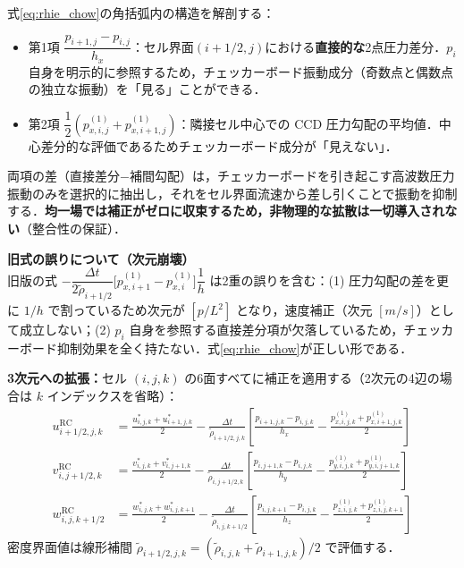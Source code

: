 \documentclass[12pt, a4paper, titlepage]{article}
\newcommand{\jp}[1]{{\normalfont\jpfont #1}}
\begin{document}
\jp{式\eqref{eq:rhie_chow}の角括弧内の構造を解剖する：}
\begin{itemize}
  \item \jp{第1項 $\dfrac{p_{i+1,j}-p_{i,j}}{h_x}$：セル界面$(i+1/2,j)$における\textbf{直接的な}2点圧力差分．$p_i$ 自身を明示的に参照するため，チェッカーボード振動成分（奇数点と偶数点の独立な振動）を「見る」ことができる．}
  \item \jp{第2項 $\dfrac{1}{2}\!\left(p^{(1)}_{x,i,j}+p^{(1)}_{x,i+1,j}\right)$：隣接セル中心での CCD 圧力勾配の平均値．中心差分的な評価であるためチェッカーボード成分が「見えない」．}
\end{itemize}
\jp{両項の差（直接差分$-$補間勾配）は，チェッカーボードを引き起こす高波数圧力振動のみを選択的に抽出し，それをセル界面流速から差し引くことで振動を抑制する．\textbf{均一場では補正がゼロに収束するため，非物理的な拡散は一切導入されない}（整合性の保証）．}

\begin{tcolorbox}[warnbox]
\textbf{\jp{旧式の誤りについて（次元崩壊）}}\\
\jp{旧版の式 $-\dfrac{\Delta t}{2\tilde\rho_{i+1/2}}\bigl[p^{(1)}_{x,i+1}-p^{(1)}_{x,i}\bigr]\dfrac{1}{h}$ は2重の誤りを含む：(1) 圧力勾配の差を更に $1/h$ で割っているため次元が $[p/L^2]$ となり，速度補正（次元 $[m/s]$）として成立しない；(2) $p_i$ 自身を参照する直接差分項が欠落しているため，チェッカーボード抑制効果を全く持たない．式\eqref{eq:rhie_chow}が正しい形である．}
\end{tcolorbox}

\jp{\textbf{3次元への拡張：}セル $(i,j,k)$ の6面すべてに補正を適用する（2次元の4辺の場合は $k$ インデックスを省略）：}
\begin{align}
  u_{i+1/2,j,k}^{\mathrm{RC}} &= \frac{u^*_{i,j,k}+u^*_{i+1,j,k}}{2}
    - \frac{\Delta t}{\tilde\rho_{i+1/2,j,k}}\!\left[\frac{p_{i+1,j,k}-p_{i,j,k}}{h_x}
      -\frac{p^{(1)}_{x,i,j,k}+p^{(1)}_{x,i+1,j,k}}{2}\right]\label{eq:rhie_chow_u}\\[3pt]
  v_{i,j+1/2,k}^{\mathrm{RC}} &= \frac{v^*_{i,j,k}+v^*_{i,j+1,k}}{2}
    - \frac{\Delta t}{\tilde\rho_{i,j+1/2,k}}\!\left[\frac{p_{i,j+1,k}-p_{i,j,k}}{h_y}
      -\frac{p^{(1)}_{y,i,j,k}+p^{(1)}_{y,i,j+1,k}}{2}\right]\label{eq:rhie_chow_v}\\[3pt]
  w_{i,j,k+1/2}^{\mathrm{RC}} &= \frac{w^*_{i,j,k}+w^*_{i,j,k+1}}{2}
    - \frac{\Delta t}{\tilde\rho_{i,j,k+1/2}}\!\left[\frac{p_{i,j,k+1}-p_{i,j,k}}{h_z}
      -\frac{p^{(1)}_{z,i,j,k}+p^{(1)}_{z,i,j,k+1}}{2}\right]\label{eq:rhie_chow_w}
\end{align}
\jp{密度界面値は線形補間 $\tilde\rho_{i+1/2,j,k}=(\tilde\rho_{i,j,k}+\tilde\rho_{i+1,j,k})/2$ で評価する．}
\end{document}
